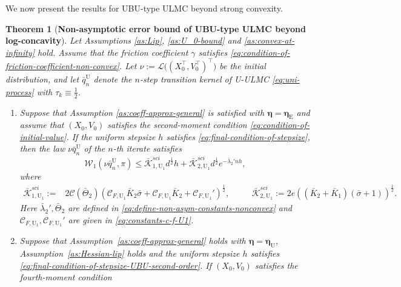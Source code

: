 \documentclass[12pt]{article}
\newenvironment{redtext}
  {\color{black}\ignorespaces}
  {\ignorespacesafterend}
\numberwithin{equation}{section}
\newtheorem{thm}{Theorem}[section]
\begin{document}
\begin{redtext}

We now present the results for UBU-type ULMC beyond strong convexity.


\begin{thm}[\textbf{Non-asymptotic error bound of UBU-type ULMC beyond log-concavity}]
\label{thm:non-convex-main-result-UBU}
Let Assumptions \ref{as:Lip}, 
\ref{as:U_0-bound} and
\ref{as:convex-at-infinity} hold.
Assume that the friction coefficient \(\gamma\) satisfies
\eqref{eq:condition-of-friction-coefficient-non-convex}.
Let
\(
\nu
:=
\mathcal L
\big(
(X_0^\top,V_0^\top)^\top
\big)
\)
be the initial distribution, and let
\(\bar q^\mathrm{U}_n\) denote the \(n\)-step transition
kernel of U-ULMC \eqref{eq:uni-process} with
\(\tau_k\equiv\frac12\).
\begin{enumerate}
\item Suppose that Assumption \ref{as:coeff-approx-general} is satisfied with $\boldsymbol{\eta}=\boldsymbol{\eta}_\mathrm{E}$ and assume that \((X_0,V_0)\) satisfies the second-moment condition \eqref{eq:condition-of-initial-value}. If the uniform stepsize $h$ satisfies \eqref{eq:final-condition-of-stepsize},
then the law
\(\nu\bar q^\mathrm{U}_n\) of the \(n\)-th iterate
satisfies
\begin{equation}
\label{eq:non-convex-main-result-UBU-gl}
\mathcal W_1
\left(
\nu\bar q^\mathrm{U}_n,
\pi
\right)
\leq
\bar{\mathcal K}_{1,\mathrm{U}_1}^{sci}
d^{\frac{1}{2}} h
+
\bar{\mathcal K}_{2,\mathrm{U}_1}^{sci}
d^{\frac{1}{2}}
e^{-\bar\lambda_2'nh},
\end{equation}
where
\begin{align*}
\bar{\mathcal K}_{1,\mathrm{U}_1}^{sci}
:={}&
2
\mathcal C(\bar\Theta_2)
\left(
\mathcal C_{F,\mathrm{U}_1}\bar K_2\bar\sigma
+
\mathcal C_{F,\mathrm{U}_1}\bar K_2
+
\mathcal C_{F,\mathrm{U}_1}'
\right)^{\frac12},
&\quad&
\bar{\mathcal K}_{2,\mathrm{U}_1}^{sci}
:=
2e
\left(
(\bar K_2+\bar K_1)
(\bar\sigma +1)
\right)^{\frac12}.
\end{align*}
Here \(\bar\lambda_2', \bar\Theta_2\) are defined in
\eqref{eq:define-non-asym-constants-nonconvex} and 
\(\mathcal C_{F,\mathrm{U}_1}, \mathcal C_{F,\mathrm{U}_1}'\) are given in \eqref{eq:constants-c-f-U1}.
\item 
Suppose that
Assumption~\ref{as:coeff-approx-general} holds with
$\boldsymbol{\eta}=\boldsymbol{\eta}_{\mathrm U}$, Assumption~\ref{as:Hessian-lip} holds and the uniform stepsize $h$ satisfies \eqref{eq:final-condition-of-stepsize-UBU-second-order}. If \((X_0,V_0)\) satisfies the fourth-moment condition

\end{enumerate}
\end{thm}
\end{redtext}
\end{document}
